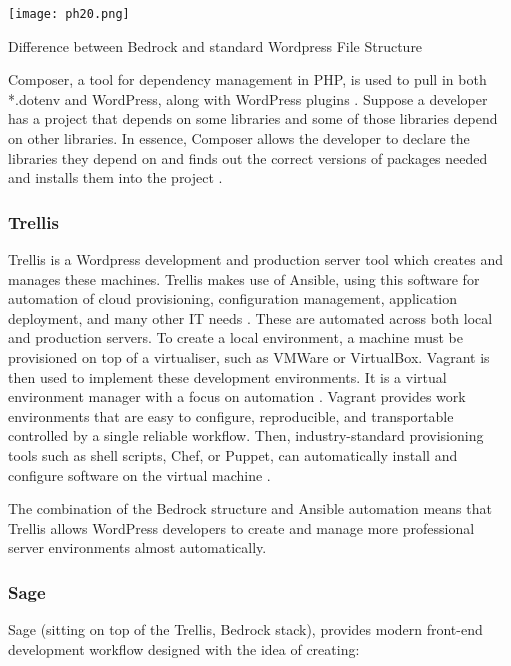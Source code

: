 \documentclass[fontsize=11pt]{extarticle}
\numberwithin{figure}{section} %
\begin{document}
\begin{table}[H]
      \centering
      \texttt{[image: ph20.png]}
      \caption{Difference between Bedrock and standard Wordpress File Structure}
\label{bedrockfolder}
 \end{table}

Composer, a tool for dependency management in PHP, is used to pull in
both *.dotenv and WordPress, along with WordPress plugins \cite{p7}.
Suppose a developer has a project that depends on some libraries and
some of those libraries depend on other libraries. In essence, Composer
allows the developer to declare the libraries they depend on and finds
out the correct versions of packages needed and installs them into the
project \cite{p8}.

\hypertarget{trellis}{%
\subsubsection{Trellis}\label{trellis}}

Trellis is a Wordpress development and production server tool which
creates and manages these machines. Trellis makes use of Ansible, using
this software for automation of cloud provisioning, configuration
management, application deployment, and many other IT needs \cite{p12}.
These are automated across both local and production servers. To create
a local environment, a machine must be provisioned on top of a
virtualiser, such as VMWare or VirtualBox. Vagrant is then used to
implement these development environments. It is a virtual environment
manager with a focus on automation \cite{p10}. Vagrant provides work
environments that are easy to configure, reproducible, and transportable
controlled by a single reliable workflow. Then, industry-standard
provisioning tools such as shell scripts, Chef, or Puppet, can
automatically install and configure software on the virtual machine
\cite{p10}.

The combination of the Bedrock structure and Ansible automation means
that Trellis allows WordPress developers to create and manage more
professional server environments almost automatically.

\hypertarget{sage}{%
\subsubsection{Sage}\label{sage}}

Sage (sitting on top of the Trellis, Bedrock stack), provides modern
front-end development workflow designed with the idea of creating:
\end{document}
